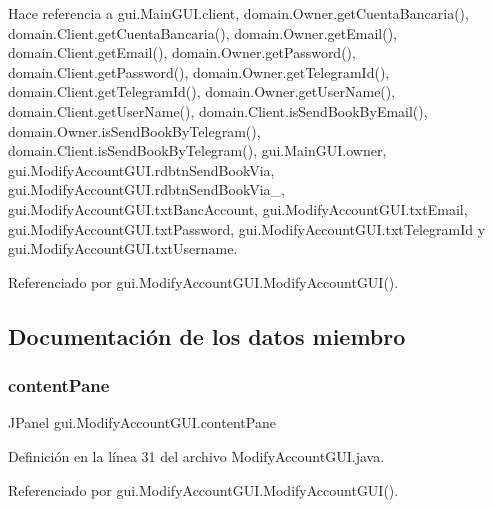 Hace referencia a gui.\+Main\+G\+U\+I.\+client, domain.\+Owner.\+get\+Cuenta\+Bancaria(), domain.\+Client.\+get\+Cuenta\+Bancaria(), domain.\+Owner.\+get\+Email(), domain.\+Client.\+get\+Email(), domain.\+Owner.\+get\+Password(), domain.\+Client.\+get\+Password(), domain.\+Owner.\+get\+Telegram\+Id(), domain.\+Client.\+get\+Telegram\+Id(), domain.\+Owner.\+get\+User\+Name(), domain.\+Client.\+get\+User\+Name(), domain.\+Client.\+is\+Send\+Book\+By\+Email(), domain.\+Owner.\+is\+Send\+Book\+By\+Telegram(), domain.\+Client.\+is\+Send\+Book\+By\+Telegram(), gui.\+Main\+G\+U\+I.\+owner, gui.\+Modify\+Account\+G\+U\+I.\+rdbtn\+Send\+Book\+Via, gui.\+Modify\+Account\+G\+U\+I.\+rdbtn\+Send\+Book\+Via\+\_, gui.\+Modify\+Account\+G\+U\+I.\+txt\+Banc\+Account, gui.\+Modify\+Account\+G\+U\+I.\+txt\+Email, gui.\+Modify\+Account\+G\+U\+I.\+txt\+Password, gui.\+Modify\+Account\+G\+U\+I.\+txt\+Telegram\+Id y gui.\+Modify\+Account\+G\+U\+I.\+txt\+Username.



Referenciado por gui.\+Modify\+Account\+G\+U\+I.\+Modify\+Account\+G\+U\+I().



\subsection{Documentación de los datos miembro}
\mbox{\label{classgui_1_1_modify_account_g_u_i_a381fa9bf3fbd1dbbe3166aa501fab1fc}} 
\subsubsection{\texorpdfstring{contentPane}{contentPane}}
{\footnotesize\ttfamily J\+Panel gui.\+Modify\+Account\+G\+U\+I.\+content\+Pane\hspace{0.3cm}{\ttfamily [private]}}



Definición en la línea 31 del archivo Modify\+Account\+G\+U\+I.\+java.



Referenciado por gui.\+Modify\+Account\+G\+U\+I.\+Modify\+Account\+G\+U\+I().

\mbox{\label{classgui_1_1_modify_account_g_u_i_aaadd5325f9f2b8ac9cb5d4bbe848d5b8}} 
